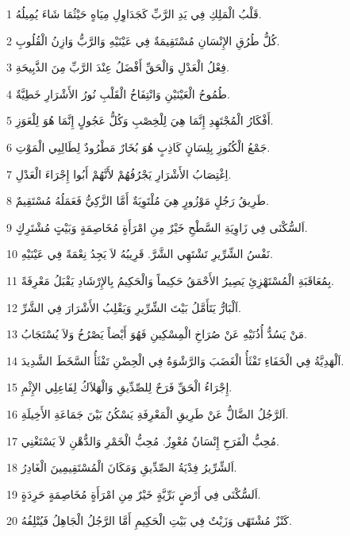 \par 1 قَلْبُ الْمَلِكِ فِي يَدِ الرَّبِّ كَجَدَاوِلِ مِيَاهٍ حَيْثُمَا شَاءَ يُمِيلُهُ.
\par 2 كُلُّ طُرُقِ الإِنْسَانِ مُسْتَقِيمَةٌ فِي عَيْنَيْهِ وَالرَّبُّ وَازِنُ الْقُلُوبِ.
\par 3 فِعْلُ الْعَدْلِ وَالْحَقِّ أَفْضَلُ عِنْدَ الرَّبِّ مِنَ الذَّبِيحَةِ.
\par 4 طُمُوحُ الْعَيْنَيْنِ وَانْتِفَاخُ الْقَلْبِ نُورُ الأَشْرَارِ خَطِيَّةٌ.
\par 5 أَفْكَارُ الْمُجْتَهِدِ إِنَّمَا هِيَ لِلْخِصْبِ وَكُلُّ عَجُولٍ إِنَّمَا هُوَ لِلْعَوَزِ.
\par 6 جَمْعُ الْكُنُوزِ بِلِسَانٍ كَاذِبٍ هُوَ بُخَارٌ مَطْرُودٌ لِطَالِبِي الْمَوْتِ.
\par 7 اِغْتِصَابُ الأَشْرَارِ يَجْرُفُهُمْ لأَنَّهُمْ أَبُوا إِجْرَاءَ الْعَدْلِ.
\par 8 طَرِيقُ رَجُلٍ مَوْزُورٍ هِيَ مُلْتَوِيَةٌ أَمَّا الزَّكِيُّ فَعَمَلُهُ مُسْتَقِيمٌ.
\par 9 اَلسُّكْنَى فِي زَاوِيَةِ السَّطْحِ خَيْرٌ مِنِ امْرَأَةٍ مُخَاصِمَةٍ وَبَيْتٍ مُشْتَرِكٍ.
\par 10 نَفْسُ الشِّرِّيرِ تَشْتَهِي الشَّرَّ. قَرِيبُهُ لاَ يَجِدُ نِعْمَةً فِي عَيْنَيْهِ.
\par 11 بِمُعَاقَبَةِ الْمُسْتَهْزِئِ يَصِيرُ الأَحْمَقُ حَكِيماً وَالْحَكِيمُ بِالإِرْشَادِ يَقْبَلُ مَعْرِفَةً.
\par 12 اَلْبَارُّ يَتَأَمَّلُ بَيْتَ الشِّرِّيرِ وَيَقْلِبُ الأَشْرَارَ فِي الشَّرِّ.
\par 13 مَنْ يَسُدُّ أُذُنَيْهِ عَنْ صُرَاخِ الْمِسْكِينِ فَهُوَ أَيْضاً يَصْرُخُ وَلاَ يُسْتَجَابُ.
\par 14 اَلْهَدِيَّةُ فِي الْخَفَاءِ تَفْثَأُ الْغَضَبَ وَالرَّشْوَةُ فِي الْحِضْنِ تَفْثَأُ السَّخَطَ الشَّدِيدَ.
\par 15 إِجْرَاءُ الْحَقِّ فَرَحٌ لِلصِّدِّيقِ وَالْهَلاَكُ لِفَاعِلِي الإِثْمِ.
\par 16 اَلرَّجُلُ الضَّالُّ عَنْ طَرِيقِ الْمَعْرِفَةِ يَسْكُنُ بَيْنَ جَمَاعَةِ الأَخِيلَةِ.
\par 17 مُحِبُّ الْفَرَحِ إِنْسَانٌ مُعْوِزٌ. مُحِبُّ الْخَمْرِ وَالدُّهْنِ لاَ يَسْتَغْنِي.
\par 18 اَلشِّرِّيرُ فِدْيَةُ الصِّدِّيقِ وَمَكَانَ الْمُسْتَقِيمِينَ الْغَادِرُ.
\par 19 اَلسُّكْنَى فِي أَرْضٍ بَرِّيَّةٍ خَيْرٌ مِنِ امْرَأَةٍ مُخَاصِمَةٍ حَرِدَةٍ.
\par 20 كَنْزٌ مُشْتَهًى وَزَيْتٌ فِي بَيْتِ الْحَكِيمِ أَمَّا الرَّجُلُ الْجَاهِلُ فَيُتْلِفُهُ.
